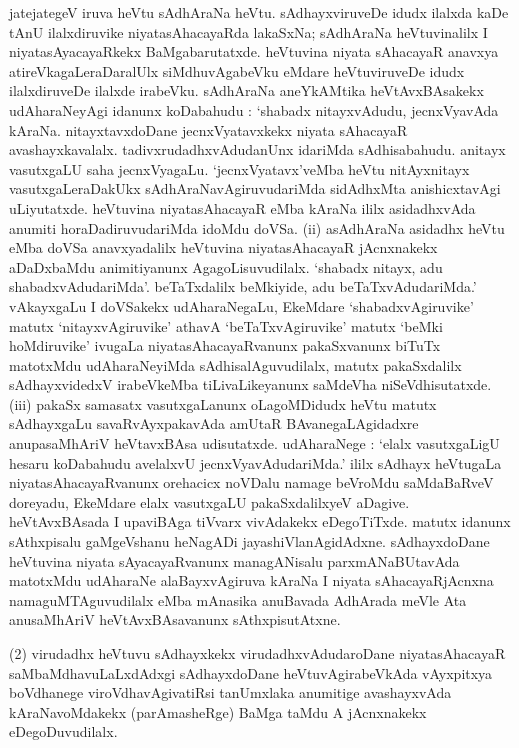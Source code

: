 jatejategeV iruva heVtu sAdhAraNa heVtu. sAdhayxviruveDe idudx ilalxda kaDe tAnU ilalxdiruvike niyatasAhacayaRda lakaSxNa; sAdhAraNa heVtuvinalilx I niyatasAyacayaRkekx BaMgabarutatxde. heVtuvina niyata sAhacayaR anavxya atireVka\-gaLeraDaralUlx siMdhuvAgabeVku eMdare heVtuviruveDe idudx ilalxdiruveDe ilalxde irabeVku. sAdhA\-raNa aneYkAMtika heVtAvxBAsakekx udAharaNeyAgi idanunx koDabahudu : `shabadx nitayxvAdudu, jecnxVyavAda kAraNa. nitayxtavxdoDane jecnxVyatavxkekx niyata sAhacayaR avashayxka\-valalx. tadivxrudadhxvAdudanUnx idariMda sAdhisabahudu. anitayx vasutxgaLU saha jecnxVya\-gaLu. `jecnxVyatavx'veMba heVtu nitAyxnitayx vasutxgaLeraDakUkx sAdhAraNavAgiruvudariMda sidAdhxMta anishicxtavAgi uLiyutatxde. heVtuvina niyatasAhacayaR eMba kAraNa ililx asidadhxvAda anumiti horaDadiruvudariMda idoMdu doVSa. {\rm(ii)} asAdhAraNa asidadhx heVtu eMba doVSa anavxyadalilx heVtuvina niyatasAhacayaR jAcnxnakekx aDaDxbaMdu animitiyanunx AgagoLisuvudilalx. `shabadx nitayx, adu shabadxvAdudariMda'. beTaTxdalilx beMkiyide, adu beTaTxvAdudariMda.' vAkayxgaLu I doVSakekx udAharaNegaLu, EkeMdare `shabadxvAgiruvike' matutx `nitayxvAgiruvike' athavA `beTaTxvAgiruvike' matutx `beMki hoMdiruvike' ivugaLa niyatasAhacayaRvanunx pakaSxvanunx biTuTx matotxMdu udAharaNeyiMda sAdhisalAguvudilalx, matutx pakaSxdalilx sAdhayxvidedxV irabeVkeMba tiLivaLikeyanunx saMdeVha niSeVdhisutatxde. {\rm(iii)} pakaSx samasatx vasutxgaLanunx oLagoMDidudx heVtu matutx sAdhayxgaLu savaRvAyxpakavAda amUtaR BAvanegaLAgidadxre anupasaMhAriV heVtavxBAsa udisutatxde. udAharaNege : `elalx vasutxgaLigU hesaru koDabahudu avelalxvU jecnxVyavAdudariMda.' ililx sAdhayx heVtugaLa niyatasAhacayaRvanunx orehacicx noVDalu namage beVroMdu saMdaBaRveV doreyadu, EkeMdare elalx vasutxgaLU pakaSxdalilxyeV aDagive. heVtAvxBAsada I upaviBAga tiVvarx vivAdakekx eDegoTiTxde. matutx idanunx sAthxpisalu gaMgeVshanu heNagADi jayashiVlanAgidAdxne. sAdhayxdoDane heVtuvina niyata sAyacayaRvanunx managANisalu parxmANaBUtavAda matotxMdu udAharaNe alaBayxvAgiruva kAraNa I niyata sAhacayaRjAcnxna namaguMTAguvudilalx eMba mAnasika anuBavada AdhArada meVle Ata anusaMhAriV heVtAvxBAsavanunx sAthxpisutAtxne.

(2) virudadhx heVtuvu sAdhayxkekx virudadhxvAdudaroDane niyatasAhacayaR saMbaMdha\-vuLaLxdAdxgi sAdhayxdoDane heVtuvAgirabeVkAda vAyxpitxya boVdhanege viroVdhavAgi\break vatiRsi tanUmxlaka anumitige avashayxvAda kAraNavoMdakekx (parAmasheRge) BaMga taMdu A jAcnxnakekx eDegoDuvudilalx.


